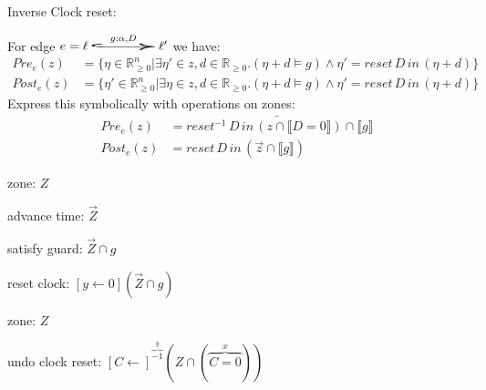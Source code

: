 \documentclass[a4paper, 10pt]{article}
\begin{document}
\begin{mdframed}
\begin{multicols}{2}
\begin{center}
\scalebox{.7}{}
\end{center}
Inverse Clock reset:
\begin{center}
\scalebox{.7}{}
\end{center}
\end{multicols}
For edge $e=\ell\overset{g:\alpha, D}{\scalebox{5}[1]{$\hookrightarrow$}}\ell'$ we have:
\begin{align*}
Pre_e(z) &= \{ \eta\in\mathds{R}^n_{\geq0} | \exists\eta'\in z,d\in\mathds{R}_{\geq0}.(\eta+d\models g)\wedge\eta' = reset\,D\,in\, (\eta+d)\} \\
Post_e(z) &= \{ \eta'\in\mathds{R}^n_{\geq0} | \exists\eta\in z,d\in\mathds{R}_{\geq0}.(\eta+d\models g)\wedge\eta' = reset\,D\,in\, (\eta+d)\}
\end{align*}
Express this symbolically with operations on zones:
\begin{align*}
Pre_e(z)  &= \overleftarrow{reset^{-1}\,D\,in\,(z\cap\llbracket D=0\rrbracket)\cap\llbracket g\rrbracket} \\
Post_e(z) &= reset\,D\,in\,(\overrightarrow{z}\cap\llbracket g\rrbracket)
\end{align*}
\begin{multicols}{2}
zone: $Z$
\begin{center}
\scalebox{.7}{}
\end{center}
advance time: $\overrightarrow{Z}$
\begin{center}
\scalebox{.7}{}
\end{center}
\columnbreak
satisfy guard: $\overrightarrow{Z}\cap g$
\begin{center}
\scalebox{.7}{}
\end{center}
reset clock: $[y\leftarrow0](\overrightarrow{Z}\cap g)$
\begin{center}
\scalebox{.7}{}
\end{center}
\end{multicols}
\begin{multicols}{2}
zone: $Z$
\begin{center}
\scalebox{.7}{}
\end{center}
undo clock reset: $[C\leftarrow]^{\overset{y}{\overbrace{-1}}}(Z\cap(\overset{x}{\overbrace{C=0}}))$

\end{multicols}
\end{mdframed}
\end{document}
